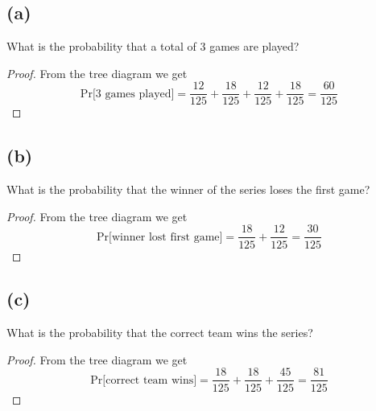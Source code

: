\documentclass[14pt]{extarticle}
\begin{document}
\subsection{(a)}
What is the probability that a total of 3 games are played?
\begin{proof}
From the tree diagram we get
$$
\text{Pr[3 games played]} = \frac{12}{125} + \frac{18}{125} + \frac{12}{125} + \frac{18}{125} = \frac{60}{125}
$$
\end{proof}

\subsection{(b)}
What is the probability that the winner of the series loses the first game?
\begin{proof}
From the tree diagram we get
$$
\text{Pr[winner lost first game]} = \frac{18}{125} + \frac{12}{125}  = \frac{30}{125}
$$
\end{proof}

\subsection{(c)}
What is the probability that the correct team wins the series?
\begin{proof}
From the tree diagram we get
$$
\text{Pr[correct team wins]} = \frac{18}{125} + \frac{18}{125} + \frac{45}{125} = \frac{81}{125}
$$
\end{proof}
\end{document}
